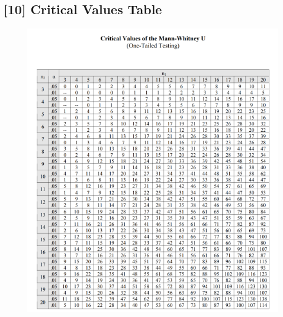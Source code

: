 \documentclass[12pt]{article}
\begin{document}
\subsection*{[10] Critical Values Table}
\begin{figure}[H]
	\includegraphics{crit-values}
	\centering
\end{figure}
\end{document}
